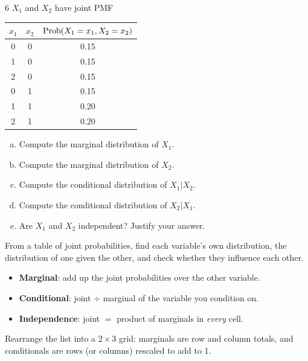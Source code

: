 \documentclass[11pt]{article}
\begin{document}
\begin{problem}{6}
$X_1$ and $X_2$ have joint PMF
\begin{center}
\begin{tabular}{cc|c}\toprule
$x_1$ & $x_2$ & $\mathrm{Prob}(X_1=x_1, X_2=x_2)$\\\midrule
0&0&0.15\\ 1&0&0.15\\ 2&0&0.15\\ 0&1&0.15\\ 1&1&0.20\\ 2&1&0.20\\\bottomrule
\end{tabular}
\end{center}
\begin{enumerate}[(a)]
\item Compute the marginal distribution of $X_1$.
\item Compute the marginal distribution of $X_2$.
\item Compute the conditional distribution of $X_1|X_2$.
\item Compute the conditional distribution of $X_2|X_1$.
\item Are $X_1$ and $X_2$ independent? Justify your answer.
\end{enumerate}
\end{problem}

\begin{restate}
From a table of joint probabilities, find each variable's own distribution, the distribution of one given the other, and check whether they influence each other.
\end{restate}

\begin{recall}
\begin{itemize}
\item \textbf{Marginal}: add up the joint probabilities over the other variable.
\item \textbf{Conditional}: joint $\div$ marginal of the variable you condition on.
\item \textbf{Independence}: joint $=$ product of marginals in \emph{every} cell.
\end{itemize}
\end{recall}

\begin{keyidea}
Rearrange the list into a $2\times3$ grid: marginals are row and column totals, and conditionals are rows (or columns) rescaled to add to 1.
\end{keyidea}
\end{document}
